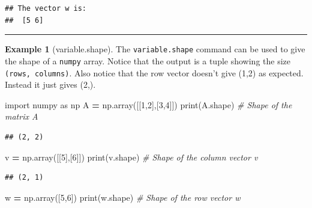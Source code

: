 \documentclass[
]{book}
\newenvironment{Shaded}{\begin{snugshade}}{\end{snugshade}}
\newcommand{\BuiltInTok}[1]{#1}
\newcommand{\CommentTok}[1]{\textcolor[rgb]{0.56,0.35,0.01}{\textit{#1}}}
\newcommand{\DecValTok}[1]{\textcolor[rgb]{0.00,0.00,0.81}{#1}}
\newcommand{\ImportTok}[1]{#1}
\newcommand{\NormalTok}[1]{#1}
\newcommand{\OperatorTok}[1]{\textcolor[rgb]{0.81,0.36,0.00}{\textbf{#1}}}
\theoremstyle{definition}
\theoremstyle{definition}
\newtheorem{example}{Example}[chapter]
\theoremstyle{definition}
\theoremstyle{remark}
\begin{document}
\begin{verbatim}
## The vector w is:
##  [5 6]
\end{verbatim}

\begin{center}\rule{0.5\linewidth}{0.5pt}\end{center}

\begin{example}[variable.shape]
\protect\hypertarget{exm:unnamed-chunk-714}{}{\label{exm:unnamed-chunk-714} {} }The \texttt{variable.shape} command can be used to give the shape of a \texttt{numpy} array. Notice that the output is a tuple showing the size \texttt{(rows,\ columns)}. Also notice that the row vector doesn't give (1,2) as expected. Instead it just gives (2,).
\end{example}

\begin{Shaded}
\begin{Highlighting}[]
\ImportTok{import}\NormalTok{ numpy }\ImportTok{as}\NormalTok{ np}
\NormalTok{A }\OperatorTok{=}\NormalTok{ np.array([[}\DecValTok{1}\NormalTok{,}\DecValTok{2}\NormalTok{],[}\DecValTok{3}\NormalTok{,}\DecValTok{4}\NormalTok{]])}
\BuiltInTok{print}\NormalTok{(A.shape) }\CommentTok{\# Shape of the matrix A}
\end{Highlighting}
\end{Shaded}

\begin{verbatim}
## (2, 2)
\end{verbatim}

\begin{Shaded}
\begin{Highlighting}[]
\NormalTok{v }\OperatorTok{=}\NormalTok{ np.array([[}\DecValTok{5}\NormalTok{],[}\DecValTok{6}\NormalTok{]])}
\BuiltInTok{print}\NormalTok{(v.shape) }\CommentTok{\# Shape of the column vector v}
\end{Highlighting}
\end{Shaded}

\begin{verbatim}
## (2, 1)
\end{verbatim}

\begin{Shaded}
\begin{Highlighting}[]
\NormalTok{w }\OperatorTok{=}\NormalTok{ np.array([}\DecValTok{5}\NormalTok{,}\DecValTok{6}\NormalTok{])}
\BuiltInTok{print}\NormalTok{(w.shape) }\CommentTok{\# Shape of the row vector w}
\end{Highlighting}
\end{Shaded}
\end{document}
